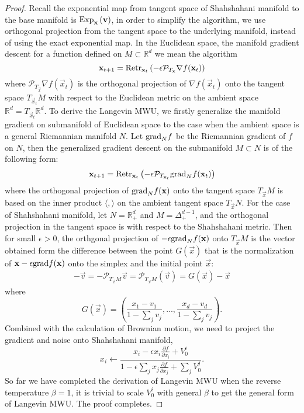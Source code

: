 \begin{proof}
Recall the exponential map from tangent space of Shahshahani manifold to the base manifold is
$\mathrm{Exp}_{\mathbf{x}}\left(\mathbf{v}\right)$,
in order to simplify the algorithm, we use orthogonal projection from the tangent space to the underlying manifold, instead of using the exact exponential map. In the Euclidean space, the manifold gradient descent for a function defined on $M\subset\mathbb{R}^d$ we mean the algorithm
\[
\mathbf{x}_{t+1}=\mathrm{Retr}_{\mathbf{x}_t}\left(-\epsilon\mathcal{P}_{T_{\mathbf{x}}}\nabla f(\mathbf{x}_t)\right)
\]
where $\mathcal{P}_{T_{\vec{x}}}\nabla f(\vec{x}_t)$ is the orthogonal projection of $\nabla f(\vec{x}_t)$ onto the tangent space $T_{\vec{x}_t}M$ with respect to the Euclidean metric on the ambient space $\mathbb{R}^d=T_{\vec{x}_t}\mathbb{R}^d$. To derive the Langevin MWU, we firstly generalize the manifold gradient on submanifold of Euclidean space to the case when the ambient space is a general Riemannian manifold $N$. Let $\mathrm{grad}_{N}f$ be the Riemannian gradient of $f$ on $N$, then the generalized gradient descent on the submanifold $M\subset N$ is of the following form:
\[
\mathbf{x}_{t+1}=\mathrm{Retr}_{\mathbf{x}_t}\left(-\epsilon\mathcal{P}_{T_{\mathbf{x}_t}}\mathrm{grad}_Nf(\mathbf{x}_t)\right)
\]
where the orthogonal projection of $\mathrm{grad}_Nf(\mathbf{x})$ onto the tangent space $T_{\vec{x}}M$ is based on the inner product $\langle,\rangle$ on the ambient tangent space $T_{\vec{x}}N$. For the case of Shahshahani manifold, let $N=\mathbb{R}^d_+$ and $M=\Delta_+^{d-1}$, and the orthogonal projection in the tangent space is with respect to the Shahshahani metric. Then for small $\epsilon>0$, the orthgonal projection of $-\epsilon\mathrm{grad}_Nf(\mathbf{x})$ onto $T_{\vec{x}}M$ is the vector obtained form the difference between the point $G(\vec{x})$ that is the normalization of $\mathbf{x}-\epsilon\mathrm{grad} f(\mathbf{x})$ onto the simplex and the initial point $\vec{x}$:
\begin{align}
-\vec{v}=-\mathcal{P}_{T_{\vec{x}}M}\vec{v}
=\mathcal{P}_{T_{\vec{x}}M}( \vec{v})
=G(\vec{x})-\vec{x}
\end{align}
where
\[
G(\vec{x})=\left(\frac{x_1- v_1}{1-\sum_jv_j},...,\frac{x_d- v_d}{1- \sum_jv_j}\right).
\]
Combined with the calculation of Brownian motion, we need to project the gradient and noise onto Shahshahani manifold,
\[
x_i\leftarrow\frac{x_i-\epsilon x_i\frac{\partial f}{\partial x_i}+V_0^i}{1-\epsilon\sum_{j}x_j\frac{\partial f}{\partial x_j}+\sum_j V_0^j}.
\]
So far we have completed the derivation of Langevin MWU when the reverse temperature $\beta=1$, it is trivial to scale $V_0^i$ with general $\beta$ to get the general form of Langevin MWU. The proof completes.
\end{proof}

